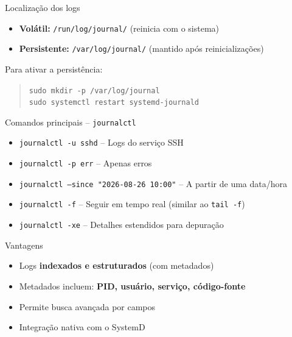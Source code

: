 \documentclass{if-beamer}
\begin{document}
\begin{frame}{Localização dos logs}
	\begin{itemize}
		\item \textbf{Volátil:} \texttt{/run/log/journal/} (reinicia com o sistema)
		\item \textbf{Persistente:} \texttt{/var/log/journal/} (mantido após reinicializações)
	\end{itemize}
	\vspace{1em}
	
	Para ativar a persistência:
		\vspace{1em}
	
	\begin{quote}
		\texttt{sudo mkdir -p /var/log/journal}\\
		\texttt{sudo systemctl restart systemd-journald}
	\end{quote}
\end{frame}


\begin{frame}{Comandos principais -- \texttt{journalctl}}
	\begin{itemize}
		\item \texttt{journalctl -u sshd} -- Logs do serviço SSH
		\item \texttt{journalctl -p err} -- Apenas erros
		\item \texttt{journalctl --since "2026-08-26 10:00"} -- A partir de uma data/hora
		\item \texttt{journalctl -f} -- Seguir em tempo real (similar ao \texttt{tail -f})
		\item \texttt{journalctl -xe} -- Detalhes estendidos para depuração
	\end{itemize}
\end{frame}


\begin{frame}{Vantagens}
	\begin{itemize}
		\item Logs \textbf{indexados e estruturados} (com metadados)
		\item Metadados incluem: \textbf{PID, usuário, serviço, código-fonte}
		\item Permite busca avançada por campos
		\item Integração nativa com o SystemD
	\end{itemize}
\end{frame}
\end{document}
